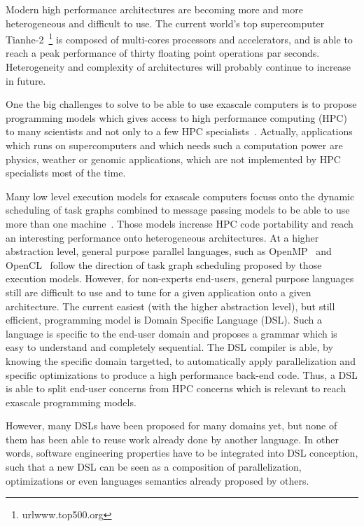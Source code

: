 Modern high performance architectures are becoming more and more heterogeneous and difficult to use. The current world's top supercomputer Tianhe-2~\footnote{url{www.top500.org}} is composed of multi-cores processors and accelerators, and is able to reach a peak performance of thirty floating point operations par seconds. Heterogeneity and complexity of architectures will probably continue to increase in future.

One the big challenges to solve to be able to use exascale computers is to propose programming models which gives access to high performance computing (HPC) to many scientists and not only to a few HPC specialists~\cite{ETP4HPC2013}. Actually, applications which runs on supercomputers and which needs such a computation power are physics, weather or genomic applications, which are not implemented by HPC specialists most of the time.

Many low level execution models for exascale computers focuss onto the dynamic scheduling of task graphs combined to message passing models to be able to use more than one machine~\cite{Gautier:2013:XRS:2510661.2511383,Augonnet2011}. Those models increase HPC code portability and reach an interesting performance onto heterogeneous architectures. At a higher abstraction level, general purpose parallel languages, such as OpenMP~\cite{660313} and OpenCL~\cite{Stone:2010:OPP:622179.1803953} follow the direction of task graph scheduling proposed by those execution models. However, for non-experts end-users, general purpose languages still are difficult to use and to tune for a given application onto a given architecture. The current easiest (with the higher abstraction level), but still efficient, programming model is Domain Specific Language (DSL). Such a language is specific to the end-user domain and proposes a grammar which is easy to understand and completely sequential. The DSL compiler is able, by knowing the specific domain targetted, to automatically apply parallelization and specific optimizations to produce a high performance back-end code. Thus, a DSL is able to split end-user concerns from HPC concerns which is relevant to reach exascale programming models.

However, many DSLs have been proposed for many domains yet, but none of them has been able to reuse work already done by another language. In other words, software engineering properties have to be integrated into DSL conception, such that a new DSL can be seen as a composition of parallelization, optimizations or even languages semantics already proposed by others.


